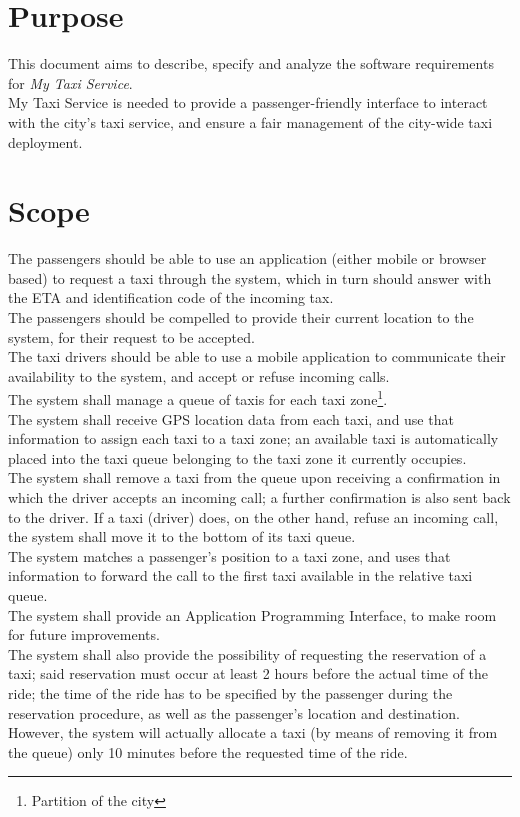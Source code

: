 \section{Purpose}
This document aims to describe, specify and analyze the software requirements for \textit{My Taxi Service}. \\
My Taxi Service is needed to provide a passenger-friendly interface to interact with the city's taxi service, and ensure
a fair management of the city-wide taxi deployment.


\section{Scope}
The passengers should be able to use an application (either mobile or browser based) to request a taxi through the system,
which in turn should answer with the ETA and identification code of the incoming tax. \\
The passengers should be compelled to provide their current location to the system, for their request to be accepted. \\
The taxi drivers should be able to use a mobile application to communicate their availability to the system, and accept
 or refuse incoming calls. \\
The system shall manage a queue of taxis for each taxi zone\footnote{Partition of the city}. \\
The system shall receive GPS location data from each taxi, and use that information to assign each taxi to a 
taxi zone; an available taxi is automatically placed into the taxi queue belonging to the taxi zone it currently occupies. \\
The system shall remove a taxi from the queue upon receiving a confirmation in which the driver accepts an incoming call; a
further confirmation is also sent back to the driver.%
 If a taxi (driver) does, on the other hand, refuse an incoming call, the system
shall move it to the bottom of its taxi queue. \\
The system matches a passenger's position to a taxi zone, and uses that information to forward the call to the first taxi
available in the relative taxi queue. \\
The system shall provide an Application Programming Interface, to make room for future improvements. \\
The system shall also provide the possibility of requesting the reservation of a taxi; said reservation must occur at least
2 hours before the actual time of the ride; the time of the ride has to be specified by the passenger during the
reservation procedure, as well as the passenger's location and destination. \\
However, the system will actually allocate a taxi (by means of removing it from the queue) only 10 minutes before the
requested time of the ride.


